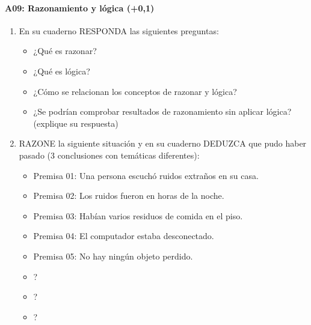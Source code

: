 \documentclass[letterpaper,10pt,spanish]{sphinxmanual}
\begin{document}
\paragraph{A09: Razonamiento y lógica (+0,1)}
\label{\detokenize{cursos/logica8/periodo01/G01:a09-razonamiento-y-logica-0-1}}
\sphinxAtStartPar
{}
\begin{enumerate}
%
\item {} 
\sphinxAtStartPar
En su cuaderno RESPONDA las siguientes preguntas:
\begin{itemize}
\item {} 
\sphinxAtStartPar
¿Qué es razonar?

\item {} 
\sphinxAtStartPar
¿Qué es lógica?

\item {} 
\sphinxAtStartPar
¿Cómo se relacionan los conceptos de razonar y lógica?

\item {} 
\sphinxAtStartPar
¿Se podrían comprobar resultados de razonamiento sin aplicar lógica? (explique su respuesta)

\end{itemize}

\item {} 
\sphinxAtStartPar
RAZONE la siguiente situación y en su cuaderno DEDUZCA que pudo haber pasado (3 conclusiones con temáticas diferentes):
\begin{itemize}
\item {} 
\sphinxAtStartPar
Premisa 01: Una persona escuchó ruidos extraños en su casa.

\item {} 
\sphinxAtStartPar
Premisa 02: Los ruidos fueron en horas de la noche.

\item {} 
\sphinxAtStartPar
Premisa 03: Habían varios residuos de comida en el piso.

\item {} 
\sphinxAtStartPar
Premisa 04: El computador estaba desconectado.

\item {} 
\sphinxAtStartPar
Premisa 05: No hay ningún objeto perdido.

\item {} 
\sphinxAtStartPar
{} ?

\item {} 
\sphinxAtStartPar
{} ?

\item {} 
\sphinxAtStartPar
{} ?

\end{itemize}

\end{enumerate}
\end{document}
